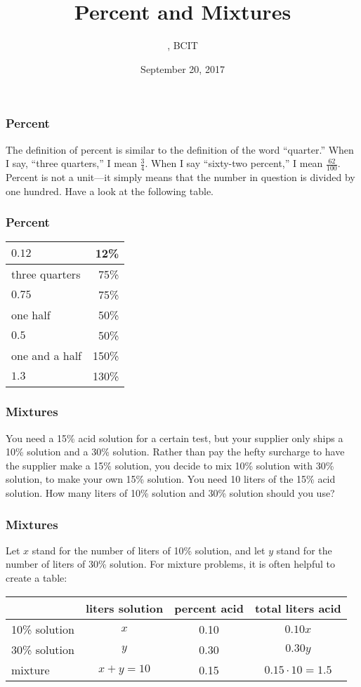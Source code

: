 \documentclass[xcolor=dvipsnames]{beamer}
\title{Percent and Mixtures}
\subtitle{{\CourseNumber}, BCIT}
\author{\CourseName}
\date{September 20, 2017}
\begin{document}
\begin{frame}
  \titlepage
\end{frame}

\begin{frame}
  \frametitle{Percent}
The definition of percent is similar to the definition of the word
``quarter.'' When I say, ``three quarters,'' I mean $\frac{3}{4}$.
When I say ``sixty-two percent,'' I mean $\frac{62}{100}$. Percent is
not a unit---it simply means that the number in question is divided by
one hundred. Have a look at the following table.
\end{frame}

\begin{frame}
  \frametitle{Percent}
\begin{tabular}{|l|r|}\hline
  $0.12$ & 12\% \\ \hline
  three quarters & 75\% \\ \hline
  $0.75$ & 75\% \\ \hline
  one half & 50\% \\ \hline
  $0.5$ & 50\% \\ \hline
  one and a half & 150\% \\ \hline
  $1.3$ & 130\% \\ \hline
\end{tabular}
\end{frame}

\begin{frame}
  \frametitle{Mixtures}
  You need a 15\% acid solution for a certain test, but your supplier
  only ships a 10\% solution and a 30\% solution. Rather than pay the
  hefty surcharge to have the supplier make a 15\% solution, you
  decide to mix 10\% solution with 30\% solution, to make your own
  15\% solution. You need 10 liters of the 15\% acid solution. How
  many liters of 10\% solution and 30\% solution should you use?
\end{frame}

\begin{frame}
  \frametitle{Mixtures}
  Let $x$ stand for the number of liters of 10\% solution, and let $y$
  stand for the number of liters of 30\% solution. For mixture
  problems, it is often helpful to create a table:

  \bigskip

  \begin{tabular}{|l|c|c|c|}\hline
    & liters solution & percent acid & total liters acid \\ \hline
    10\% solution & $x$ & 0.10 & $0.10x$ \\ \hline
    30\% solution & $y$ & 0.30 & $0.30y$ \\ \hline
    mixture & $x+y=10$ & 0.15 & $0.15\cdot{}10=1.5$ \\ \hline
  \end{tabular}
\end{frame}
\end{document}
